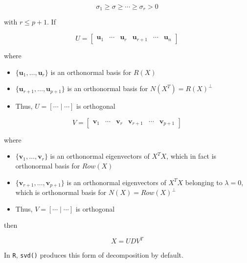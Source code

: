 \documentclass[]{book}
\theoremstyle{definition}
\theoremstyle{definition}
\theoremstyle{definition}
\theoremstyle{remark}
\begin{document}
\[\sigma_1 \ge \sigma \ge \cdots \ge \sigma_r > 0\]

with \(r \le p + 1\). If

\[
U = \left[\begin{array}{ccc|ccc}
  \mathbf{u}_1 & \cdots & \mathbf{u}_r & \mathbf{u}_{r + 1} & \cdots & \mathbf{u}_n
\end{array}\right]
\]

where

\begin{itemize}
  \item $\{ \mathbf{u}_1, \ldots, \mathbf{u}_r \}$ is an orthonormal basis for $R(X)$
  \item $\{ \mathbf{u}_{r + 1}, \ldots, \mathbf{u}_{p + 1} \}$ is an orthonormal basis for $N(X^T) = R(X)^{\perp}$
  \item Thus, $U = [ \cdots \mid \cdots ]$ is orthogonal
\end{itemize}

\[
V = \left[\begin{array}{ccc|ccc}
  \mathbf{v}_1 & \cdots & \mathbf{v}_r & \mathbf{v}_{r + 1} & \cdots & \mathbf{v}_{p + 1}
\end{array}\right]
\]

where

\begin{itemize}
  \item $\{ \mathbf{v}_1, \ldots, \mathbf{v}_r \}$ is an orthonormal eigenvectors of $X^T X$, which in fact is orthonormal basis for $Row(X)$
  \item $\{ \mathbf{v}_{r + 1}, \ldots, \mathbf{v}_{p + 1} \}$ is an orthonormal eigenvectors of $X^T X$ belonging to $\lambda = 0$, which is orthonormal basis for $N(X) = Row(X)^{\perp}$
  \item Thus, $V = [ \cdots \mid \cdots ]$ is orthogonal
\end{itemize}

then

\[X = UDV^T\]

In \texttt{R}, \texttt{svd()} produces this form of decomposition by default.
\end{document}

